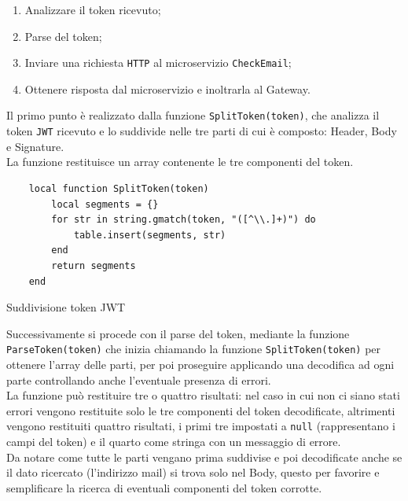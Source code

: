 \begin{enumerate}
	\item Analizzare il token ricevuto;
	\item Parse del token;
	\item Inviare una richiesta \texttt{HTTP} al microservizio \texttt{CheckEmail};
	\item Ottenere risposta dal microservizio e inoltrarla al Gateway.
\end{enumerate}

Il primo punto è realizzato dalla funzione \texttt{SplitToken(token)}, che analizza il token \texttt{JWT} ricevuto e lo suddivide nelle tre parti di cui è composto: Header, Body e Signature.\\
La funzione restituisce un array contenente le tre componenti del token.

\begin{algorithm}
\centering
\begin{verbatim}
	local function SplitToken(token)
		local segments = {}
		for str in string.gmatch(token, "([^\\.]+)") do
			table.insert(segments, str)
		end
		return segments
	end
\end{verbatim}
\caption{Suddivisione token JWT}\label{alg:splittoken}
\end{algorithm}

Successivamente si procede con il parse del token, mediante la funzione \texttt{ParseToken(token)} che inizia chiamando la funzione \texttt{SplitToken(token)}
per ottenere l'array delle parti, per poi proseguire applicando una decodifica ad ogni parte controllando anche l'eventuale presenza di errori.\\
La funzione può restituire tre o quattro risultati: nel caso in cui non ci siano stati errori vengono restituite solo le tre componenti del token decodificate, altrimenti 
vengono restituiti quattro risultati, i primi tre impostati a \texttt{null} (rappresentano i campi del token) e il quarto come stringa con un messaggio di errore.\\
Da notare come tutte le parti vengano prima suddivise e poi decodificate anche se il dato ricercato (l'indirizzo mail) si trova solo nel Body, questo per favorire e semplificare 
la ricerca di eventuali componenti del token corrotte.

